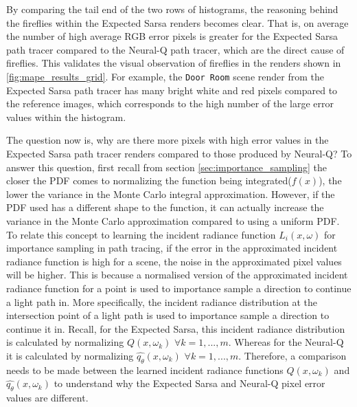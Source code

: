\documentclass[../dissertation.tex]{subfiles}
\begin{document}
By comparing the tail end of the two rows of histograms, the reasoning behind the fireflies within the Expected Sarsa renders becomes clear. That is, on average the number of high average RGB error pixels is greater for the Expected Sarsa path tracer compared to the Neural-Q path tracer, which are the direct cause of fireflies. This validates the visual observation of fireflies in the renders shown in \ref{fig:mape_results_grid}. For example, the \verb|Door Room| scene render from the Expected Sarsa path tracer has many bright white and red pixels compared to the reference images, which corresponds to the high number of the large error values within the histogram.

The question now is, why are there more pixels with high error values in the Expected Sarsa path tracer renders compared to those produced by Neural-Q? To answer this question, first recall from section \ref{sec:importance_sampling} the closer the PDF comes to normalizing the function being integrated($f(x)$), the lower the variance in the Monte Carlo integral approximation. However, if the PDF used has a different shape to the function, it can actually increase the variance in the Monte Carlo approximation compared to using a uniform PDF. To relate this concept to learning the incident radiance function $L_i(x, \omega)$ for importance sampling in path tracing, if the error in the approximated incident radiance function is high for a scene, the noise in the approximated pixel values will be higher. This is because a normalised version of the approximated incident radiance function for a point is used to importance sample a direction to continue a light path in. More specifically, the incident radiance distribution at the intersection point of a light path is used to importance sample a direction to continue it in. Recall, for the Expected Sarsa, this incident radiance distribution is calculated by normalizing $Q(x ,\omega_k)$ $\forall k = 1, ..., m$. Whereas for the Neural-Q it is calculated by normalizing $\hat{q_\theta}(x, \omega_k)$ $\forall k = 1,..., m$. Therefore, a comparison needs to be made between the learned incident radiance functions $Q(x ,\omega_k)$ and $\hat{q_\theta}(x, \omega_k)$  to understand why the Expected Sarsa and Neural-Q pixel error values are different.
\end{document}
